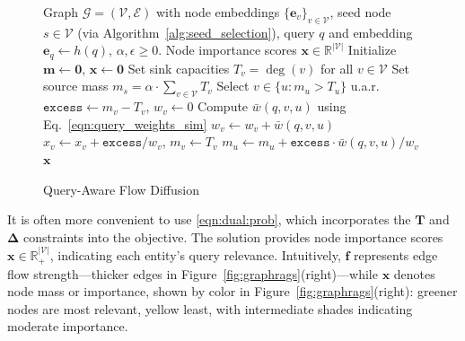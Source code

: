 \documentclass{article} %
\begin{document}
\begin{figure}
\begin{minipage}{0.5\textwidth}
\vspace{-.35cm}
\begin{algorithm}[H]
\caption{Query-Aware Flow Diffusion%
}\label{alg:single_seed_query_diffusion}
\begin{algorithmic}[1]
\Input Graph $\mathcal{G} = (\mathcal{V}, \mathcal{E})$ with node embeddings 
$\{\mathbf{e}_v\}_{v \in \mathcal{V}}$, seed node $s \in \mathcal{V}$ (via Algorithm~\ref{alg:seed_selection}), 
query $q$ and embedding $\mathbf{e}_q \gets h(q)$, $\alpha, \epsilon \geq 0$.
\Output Node importance scores $\mathbf{x} \in \mathbb{R}^{|\mathcal{V}|}$
\State Initialize $\mathbf{m} \gets \mathbf{0}$, $\mathbf{x} \gets \mathbf{0}$
\State Set sink capacities $T_v = \deg(v)$ for all $v \in \mathcal{V}$
\State Set source mass $m_s = \alpha \cdot \sum_{v \in \mathcal{V}} T_v$
    \State Select $v \in \{u : m_u > T_u\}$ u.a.r.
    \State $\texttt{excess} \gets m_v - T_v$, \quad $w_v \gets 0$
        \State Compute $\bar{w}(q, v, u)$ using Eq.~\eqref{eqn:query_weights_sim}
        \State $w_v \gets w_v + \bar{w}(q, v, u)$ 
    \EndFor
    \State $x_v \gets x_v + \texttt{excess} / w_v$, \quad $m_v \gets T_v$
        \State $m_u \gets m_u + \texttt{excess} \cdot \bar{w}(q, v, u)/w_v$
    \EndFor
\EndWhile
\State \Return $\mathbf{x}$
\end{algorithmic}
\end{algorithm}
\vspace{-.7cm}
\end{minipage}
\end{figure}
It is often more convenient to use \eqref{eqn:dual:prob}, which incorporates the $\boldsymbol{T}$ and $\boldsymbol{\Delta}$ constraints into the objective. The solution provides node importance scores $ \mathbf{x} \in \mathbb{R}^{|\mathcal{V}|}_{+}$, indicating each entity’s query relevance. Intuitively, $\mathbf{f}$ represents edge flow strength—thicker edges in Figure~\ref{fig:graphrags}(right)—while $\mathbf{x}$ denotes node mass or importance, shown by color in Figure~\ref{fig:graphrags}(right): greener nodes are most relevant, yellow least, with intermediate shades indicating moderate importance.
\end{document}
